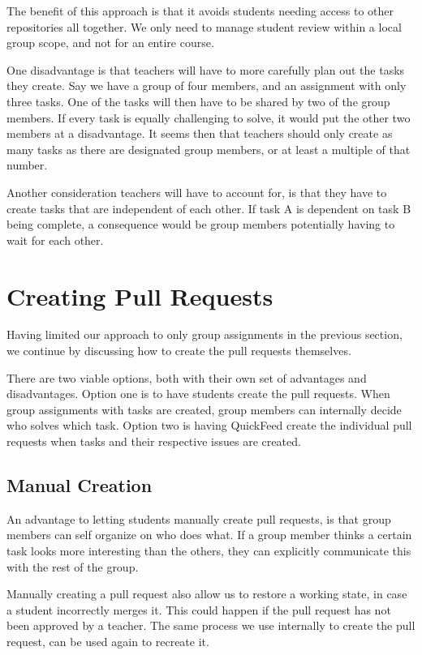 The benefit of this approach is that it avoids students needing access to other repositories all together.
We only need to manage student review within a local group scope, and not for an entire course.

One disadvantage is that teachers will have to more carefully plan out the tasks they create.
Say we have a group of four members, and an assignment with only three tasks.
One of the tasks will then have to be shared by two of the group members.
If every task is equally challenging to solve, it would put the other two members at a disadvantage.
It seems then that teachers should only create as many tasks as there are designated group members, or at least a multiple of that number.

Another consideration teachers will have to account for, is that they have to create tasks that are independent of each other.
If task A is dependent on task B being complete, a consequence would be group members potentially having to wait for each other.

\section{Creating Pull Requests}
\label{sec:creating-pull-requests}

Having limited our approach to only group assignments in the previous section, we continue by discussing how to create the pull requests themselves.

There are two viable options, both with their own set of advantages and disadvantages.
Option one is to have students create the pull requests.
When group assignments with tasks are created, group members can internally decide who solves which task.
Option two is having QuickFeed create the individual pull requests when tasks and their respective issues are created.

\subsection{Manual Creation}

An advantage to letting students manually create pull requests, is that group members can self organize on who does what.
If a group member thinks a certain task looks more interesting than the others, they can explicitly communicate this with the rest of the group.

Manually creating a pull request also allow us to restore a working state, in case a student incorrectly merges it.
This could happen if the pull request has not been approved by a teacher.
The same process we use internally to create the pull request, can be used again to recreate it.

